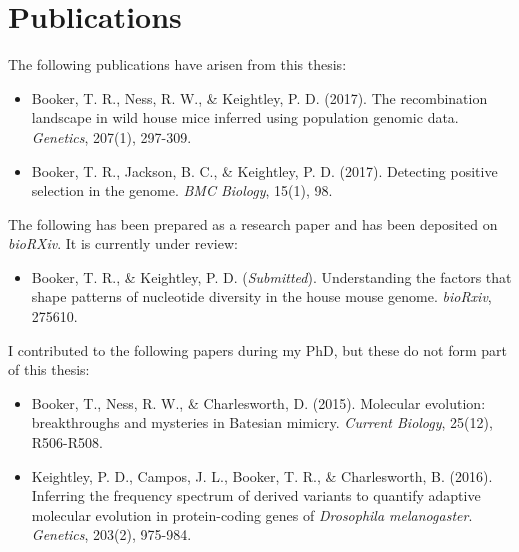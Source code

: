 \chapter{Publications}
\singlespacing
\noindent
The following publications have arisen from this thesis:
\begin{itemize}
\item Booker, T. R., Ness, R. W., \& Keightley, P. D. (2017). The recombination landscape in wild house mice inferred using population genomic data. \textit{Genetics}, 207(1), 297-309.
\item Booker, T. R., Jackson, B. C., \& Keightley, P. D. (2017). Detecting positive selection in the genome. \textit{BMC Biology}, 15(1), 98.
\end{itemize}
 
\noindent
The following has been prepared as a research paper and has been deposited on \textit{bioRXiv}. It is currently under review:
\begin{itemize}
\item Booker, T. R., \& Keightley, P. D. (\textit{Submitted}). Understanding the factors that shape patterns of nucleotide diversity in the house mouse genome. \textit{bioRxiv}, 275610.
\end{itemize}
 
\noindent
I contributed to the following papers during my PhD, but these do not form part of this thesis:
\begin{itemize}
\item Booker, T., Ness, R. W., \& Charlesworth, D. (2015). Molecular evolution: breakthroughs and mysteries in Batesian mimicry. \textit{Current Biology}, 25(12), R506-R508.
\item Keightley, P. D., Campos, J. L., Booker, T. R., \& Charlesworth, B. (2016). Inferring the frequency spectrum of derived variants to quantify adaptive molecular evolution in protein-coding genes of \textit{Drosophila melanogaster}. \textit{Genetics}, 203(2), 975-984.
\end{itemize}
  \doublespacing